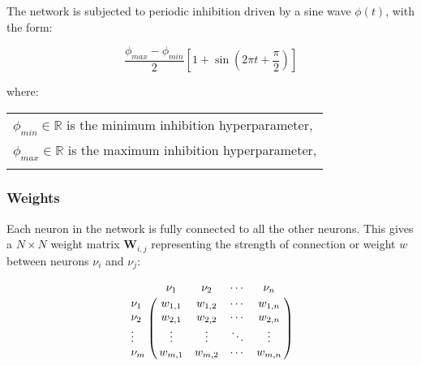     The network is subjected to periodic inhibition driven by a sine wave \(\phi(t)\), with the form:


        \begin{equation}
            \frac{\phi_{max} - \phi_{min}}{2} \left[1 +  \sin \left(2 \pi t + \frac{\pi}{2} \right) \right]
        \end{equation}
        
        where:

        \begin{tabular}{l} \\
            \(\phi_{min} \in \mathbb{R}\) is the minimum inhibition hyperparameter, \\
            \(\phi_{max} \in \mathbb{R}\) is the maximum inhibition hyperparameter, \\
        \label{tab:conditions_sine_wave} \end{tabular} \bigskip


\subsubsection{Weights}


    Each neuron in the network is fully connected to all the other neurons.
    This gives a \(N \times N\) weight matrix \(\boldsymbol{W}_{i, j}\) representing the strength of connection or weight \(w\) between neurons \(\nu_{i}\) and \(\textit{}\nu_{j}\):

    \[\bordermatrix{
        ~ & \nu_1 & \nu_2 & \cdots & \nu_n  \cr
        \nu_1 &  w_{1, 1} & w_{1, 2} & \cdots & w_{1, n}  \cr
        \nu_2 &  w_{2, 1} & w_{2, 2} & \cdots & w_{2, n}  \cr
        \vdots &  \vdots  & \vdots & \ddots & \vdots  \cr
        \nu_m &  w_{m, 1} & w_{m, 2} & \cdots & w_{m, n}
    }\] \bigskip



